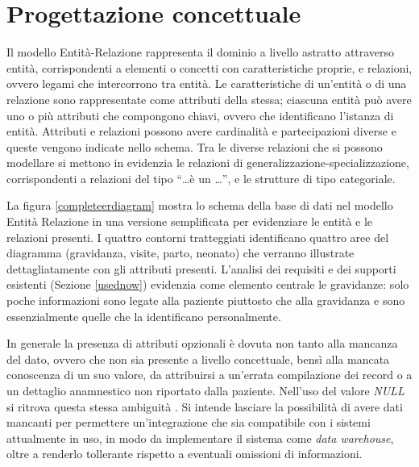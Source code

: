 \chapter{Progettazione concettuale}
\label{conceptual}

\newcommand{\ent}[1]{{\Large #1}}
\newcommand{\card}[1]{{\footnotesize #1}}
\newcommand{\CZU}{\card{(0,1)}}
\newcommand{\CZN}{\card{(0,n)}}
\newcommand{\CUU}{\card{(1,1)}}
\newcommand{\CUN}{\card{(1,n)}}
\newcommand{\pk}[1]{\textbf{#1} \faKey}
\newcommand{\mbn}[1]{\emph{#1}}
\newcommand{\ty}[1]{{\footnotesize #1}}

Il modello Entità-Relazione rappresenta il dominio a livello astratto attraverso entità, corrispondenti a elementi o concetti con caratteristiche proprie, e relazioni, ovvero legami che intercorrono tra entità.
Le caratteristiche di un'entità o di una relazione sono rappresentate come attributi della stessa; ciascuna entità può avere uno o più attributi che compongono chiavi, ovvero che identificano l'istanza di entità.
Attributi e relazioni possono avere cardinalità e partecipazioni diverse e queste vengono indicate nello schema.
Tra le diverse relazioni che si possono modellare si mettono in evidenzia le relazioni di generalizzazione-specializzazione, corrispondenti a relazioni del tipo \enquote{\dots è un \dots}, e le strutture di tipo categoriale.

La figura \ref{completeerdiagram} mostra lo schema della base di dati nel modello Entità Relazione in una versione semplificata per evidenziare le entità e le relazioni presenti.
I quattro contorni tratteggiati identificano quattro aree del diagramma (gravidanza, visite, parto, neonato) che verranno illustrate dettagliatamente con gli attributi presenti.
L'analisi dei requisiti e dei supporti esistenti (Sezione \ref{usednow}) evidenzia come elemento centrale le gravidanze: solo poche informazioni sono legate alla paziente piuttosto che alla gravidanza e sono essenzialmente quelle che la identificano personalmente.

In generale la presenza di attributi opzionali è dovuta non tanto alla mancanza del dato, ovvero che non sia presente a livello concettuale, bensì alla mancata conoscenza di un suo valore, da attribuirsi a un'errata compilazione dei record o a un dettaglio anamnestico non riportato dalla paziente.
Nell'uso del valore \emph{NULL} si ritrova questa stessa ambiguità \cite{Sil11}.
Si intende lasciare la possibilità di avere dati mancanti per permettere un'integrazione che sia compatibile con i sistemi attualmente in uso, in modo da implementare il sistema come \emph{data warehouse}, oltre a renderlo tollerante rispetto a eventuali omissioni di informazioni.


